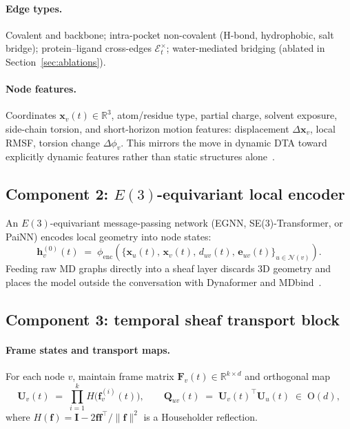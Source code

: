 \documentclass[12pt,a4paper]{article}
\begin{document}
\paragraph{Edge types.}
Covalent and backbone; intra-pocket non-covalent (H-bond, hydrophobic,
salt bridge); protein--ligand cross-edges $\mathcal{E}^{\times}_t$;
water-mediated bridging (ablated in Section~\ref{sec:ablations}).

\paragraph{Node features.}
Coordinates $\mathbf{x}_v(t)\in\mathbb{R}^3$, atom/residue type, partial
charge, solvent exposure, side-chain torsion, and short-horizon motion
features: displacement $\Delta\mathbf{x}_v$, local RMSF, torsion change
$\Delta\phi_v$.
This mirrors the move in dynamic DTA toward explicitly dynamic features
rather than static structures alone~\citep{dynamicdta2025}.

\subsection{Component 2: $E(3)$-equivariant local encoder}
\label{sec:equivariant}

An $E(3)$-equivariant message-passing network (EGNN, SE(3)-Transformer,
or PaiNN) encodes local geometry into node states:
\begin{equation}
  \mathbf{h}_v^{(0)}(t)
  \;=\;
  \phi_{\mathrm{enc}}\!\left(
    \bigl\{
      \mathbf{x}_u(t),\,\mathbf{x}_v(t),\,d_{uv}(t),\,\mathbf{e}_{uv}(t)
    \bigr\}_{u\in\mathcal{N}(v)}
  \right).
  \label{eq:equiv}
\end{equation}
Feeding raw MD graphs directly into a sheaf layer discards 3D geometry
and places the model outside the conversation with Dynaformer
\citep{dynaformer2024} and MDbind~\citep{mdbind2025}.

\subsection{Component 3: temporal sheaf transport block}
\label{sec:sheaf}

\paragraph{Frame states and transport maps.}
For each node $v$, maintain frame matrix
$\mathbf{F}_v(t)\in\mathbb{R}^{k\times d}$ and orthogonal map
\begin{equation}
  \mathbf{U}_v(t)
  \;=\;
  \prod_{i=1}^{k} H\!\bigl(\mathbf{f}^{(i)}_v(t)\bigr),
  \qquad
  \mathbf{Q}_{uv}(t)
  \;=\;
  \mathbf{U}_v(t)^{\!\top}\mathbf{U}_u(t)
  \;\in\;\mathrm{O}(d),
  \label{eq:householder}
\end{equation}
where $H(\mathbf{f})=\mathbf{I}-2\mathbf{f}\mathbf{f}^{\top}/\|\mathbf{f}\|^2$
is a Householder reflection.
\end{document}
